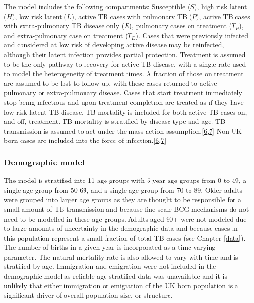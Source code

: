 \documentclass[11pt,twoside]{bristolthesis}
\begin{document}
  The model includes the following compartments: Susceptible (\(S\)), high risk latent (\(H\)), low risk latent (\(L\)), active TB cases with pulmonary TB (\(P\)), active TB cases with extra-pulmonary TB disease only (\(E\)), pulmonary cases on treatment (\(T_P\)), and extra-pulmonary case on treatment (\(T_E\)). Cases that were previously infected and considered at low risk of developing active disease may be reinfected, although their latent infection provides partial protection. Treatment is assumed to be the only pathway to recovery for active TB disease, with a single rate used to model the heterogeneity of treatment times. A fraction of those on treatment are assumed to be lost to follow up, with these cases returned to active pulmonary or extra-pulmonary disease. Cases that start treatment immediately stop being infectious and upon treatment completion are treated as if they have low risk latent TB disease. TB mortality is included for both active TB cases on, and off, treatment. TB mortality is stratified by disease type and age. TB transmission is assumed to act under the mass action assumption.{[}\protect\hyperlink{ref-Anderson1991}{6},\protect\hyperlink{ref-Keeling2007}{7}{]} Non-UK born cases are included into the force of infection.{[}\protect\hyperlink{ref-Anderson1991}{6},\protect\hyperlink{ref-Keeling2007}{7}{]}
  
  \hypertarget{demographic-model}{%
  \subsubsection{Demographic model}\label{demographic-model}}
  
  The model is stratified into 11 age groups with 5 year age groups from 0 to 49, a single age group from 50-69, and a single age group from 70 to 89. Older adults were grouped into larger age groups as they are thought to be responsible for a small amount of TB transmission and because fine scale BCG mechanisms do not need to be modelled in these age groups. Adults aged 90+ were not modeled due to large amounts of uncertainty in the demographic data and because cases in this population represent a small fraction of total TB cases (see Chapter \ref{data}). The number of births in a given year is incorporated as a time varying parameter. The natural mortality rate is also allowed to vary with time and is stratified by age. Immigration and emigration were not included in the demographic model as reliable age stratified data was unavailable and it is unlikely that either immigration or emigration of the UK born population is a significant driver of overall population size, or structure.
  
\end{document}
